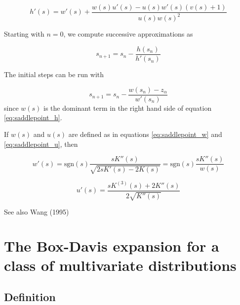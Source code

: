 \begin{equation}
	h'(s) = w'(s) + \frac{w(s) u'(s) - u(s) w'(s)\left(v(s)+1\right)}{u(s) w(s)^2}
\end{equation}


Starting with $n=0$, we compute successive approximations as

\begin{equation}
	s_{n+1} = s_n - \frac{h(s_n)}{h'(s_n)}
\end{equation}


The initial steps can be run with 

\begin{equation}
	s_{n+1} = s_n - \frac{w(s_n) - z_\alpha}{w'(s_n)}
\end{equation}
since $w(s)$ is the dominant term in the right hand side of equation \ref{eq:saddlepoint_h}.



If $w(s)$ and $u(s)$ are defined as in equations \ref{eq:saddlepoint_w} and \ref{eq:saddlepoint_u}, then

\begin{equation}
	w'(s) = \text{sgn}(s) \frac{s K''(s)}{\sqrt{2 s K'(s) - 2 K(s)}} = \text{sgn}(s) \frac{s K''(s)}{w(s)}
\end{equation}

\begin{equation}
	u'(s) = \frac{s K^{(3)}(s) + 2 K''(s)}{2 \sqrt{K''(s)}}
\end{equation}


See also Wang (1995)









\newpage
\section[The Box-Davis expansion]{The Box-Davis expansion for a class of multivariate distributions}


\subsection{Definition}
\label{BoxDavisDistributionDistributionDefinition}

